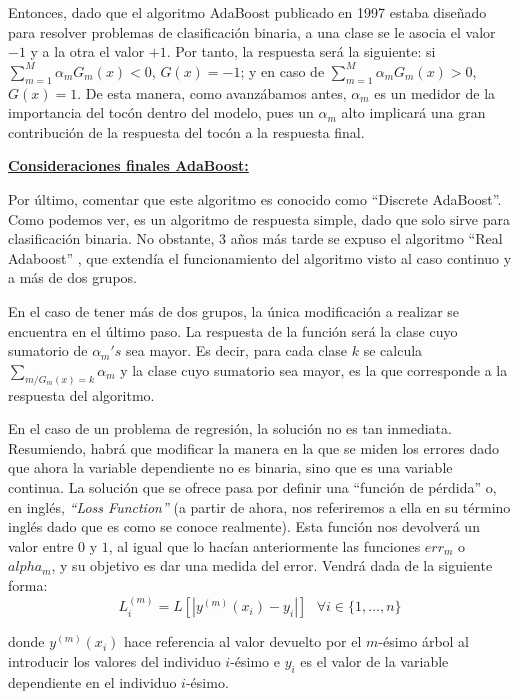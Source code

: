 \documentclass[12pt,twoside]{article}
\begin{document}
Entonces, dado que el algoritmo AdaBoost publicado en 1997 estaba diseñado para resolver problemas de clasificación binaria, a una clase se le asocia el valor $-1$ y a la otra el valor $+1$. Por tanto, la respuesta será la siguiente: si $\sum_{m=1}^M \alpha_m G_m(x) < 0$, $G(x) = - 1$; y en caso de $\sum_{m=1}^M \alpha_m G_m(x) > 0$, $G(x) = 1$. De esta manera, como avanzábamos antes, $\alpha_m$ es un medidor de la importancia del tocón dentro del modelo, pues un $\alpha_m$ alto implicará una gran contribución de la respuesta del tocón a la respuesta final.

\bigskip

\textbf{\underline{Consideraciones finales AdaBoost:}}

Por último, comentar que este algoritmo es conocido como ``Discrete AdaBoost''. Como podemos ver, es un algoritmo de respuesta simple, dado que solo sirve para clasificación binaria. No obstante, 3 años más tarde se expuso el algoritmo ``Real Adaboost'' \cite{FR02}, que extendía el funcionamiento del algoritmo visto al caso continuo y a más de dos grupos.

En el caso de tener más de dos grupos, la única modificación a realizar se encuentra en el último paso. La respuesta de la función será la clase cuyo sumatorio de $\alpha_m's$ sea mayor. Es decir, para cada clase $k$ se calcula $\sum_{m / G_m(x) = k} \alpha_m$ y la clase cuyo sumatorio sea mayor, es la que corresponde a la respuesta del algoritmo.

En el caso de un problema de regresión, la solución no es tan inmediata. Resumiendo, habrá que modificar la manera en la que se miden los errores dado que ahora la variable dependiente no es binaria, sino que es una variable continua. La solución que se ofrece pasa por definir una ``función de pérdida'' o, en inglés, \textit{``Loss Function''} (a partir de ahora, nos referiremos a ella en su término inglés dado que es como se conoce realmente). Esta función nos devolverá un valor entre $0$ y $1$, al igual que lo hacían anteriormente las funciones $err_m$ o $alpha_m$, y su objetivo es dar una medida del error. Vendrá dada de la siguiente forma:
\begin{equation*}
L_i^{(m)} = L \left[ |y^{(m)}(x_i) - y_i| \right] \, \, \, \, \forall i \in \{ 1, \dots, n \}
\end{equation*}

\noindent
donde $y^{(m)}(x_i)$ hace referencia al valor devuelto por el $m$-ésimo árbol al introducir los valores del individuo $i$-ésimo e $y_i$ es el valor de la variable dependiente en el individuo $i$-ésimo.
\end{document}
